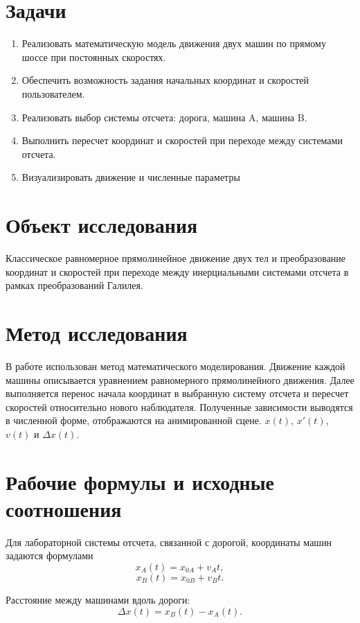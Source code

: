 \documentclass[12pt,a4paper]{article}
\begin{document}
\section{Задачи}
\begin{enumerate}
    \item Реализовать математическую модель движения двух машин по прямому шоссе при постоянных скоростях.
    \item Обеспечить возможность задания начальных координат и скоростей пользователем.
    \item Реализовать выбор системы отсчета: дорога, машина A, машина B.
    \item Выполнить пересчет координат и скоростей при переходе между системами отсчета.
    \item Визуализировать движение и численные параметры
\end{enumerate}

\section{Объект исследования}
Классическое равномерное прямолинейное движение двух тел и преобразование координат и скоростей при переходе между инерциальными системами отсчета в рамках преобразований Галилея.

\section{Метод исследования}
В работе использован метод математического моделирования. Движение каждой машины описывается уравнением равномерного прямолинейного движения. Далее выполняется перенос начала координат в выбранную систему отсчета и пересчет скоростей относительно нового наблюдателя. Полученные зависимости выводятся в численной форме, отображаются на анимированной сцене. $x(t)$, $x'(t)$, $v(t)$ и $\Delta x(t)$.

\section{Рабочие формулы и исходные соотношения}
Для лабораторной системы отсчета, связанной с дорогой, координаты машин задаются формулами
\begin{equation}
 x_A(t)=x_{0A}+v_A t,
\end{equation}
\begin{equation}
 x_B(t)=x_{0B}+v_B t.
\end{equation}

Расстояние между машинами вдоль дороги:
\begin{equation}
 \Delta x(t)=x_B(t)-x_A(t).
\end{equation}
\end{document}
